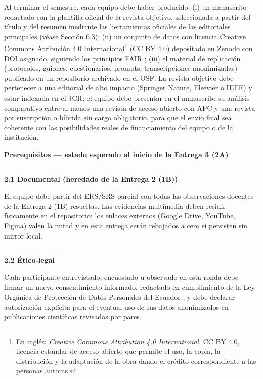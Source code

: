 \documentclass[11pt,a4paper]{article}
\newcounter{secc}
\newcommand{\secband}[1]{%
    \stepcounter{secc}\par\vspace{9pt}\noindent
    {\setlength{\fboxsep}{0pt}%
        \colorbox{uteqgold}{\parbox[c][20pt][c]{0.05\textwidth}{\centering\textbf{\color{white}\small \arabic{secc}}}}%
        \colorbox{uteqgreen}{\parbox[c][20pt][c]{0.95\textwidth}{\hspace{8pt}\textbf{\color{white}\small #1}}}%
    }\par\vspace{5pt}}
\newcommand{\submark}[1]{\par\vspace{4pt}\noindent
    {\color{uteqgreen}\rule[-1pt]{3.5pt}{12pt}}\hspace{6pt}\textbf{\color{uteqgreen}#1}\par\vspace{2pt}}
\begin{document}
\begin{pubbox}[title=Objetivo terminal (Entrega 4): publicación de alto impacto en revista con o sin APC]
Al terminar el semestre, cada equipo debe haber producido: (i) un manuscrito redactado con la plantilla oficial de la revista objetivo, seleccionada a partir del título y del resumen mediante las herramientas oficiales de las editoriales principales (véase Sección 6.3); (ii) un conjunto de datos con licencia Creative Commons Atribución 4.0 Internacional\footnote{En inglés: \emph{Creative Commons Attribution 4.0 International}, CC BY 4.0, licencia estándar de acceso abierto que permite el uso, la copia, la distribución y la adaptación de la obra dando el crédito correspondiente a las personas autoras.} (CC BY 4.0) depositado en Zenodo con DOI asignado, siguiendo los principios FAIR \cite{wilkinson2016fair}; (iii) el material de replicación (protocolos, guiones, cuestionarios, prompts, transcripciones anonimizadas) publicado en un repositorio archivado en el OSF.
La revista objetivo debe pertenecer a una editorial de alto impacto (Springer Nature, Elsevier o IEEE) y estar indexada en el JCR; el equipo debe presentar en el manuscrito su análisis comparativo entre al menos una revista de acceso abierto con APC y una revista por suscripción o híbrida sin cargo obligatorio, para que el envío final sea coherente con las posibilidades reales de financiamiento del equipo o de la institución.
\end{pubbox}

\secband{Prerequisitos --- estado esperado al inicio de la Entrega 3 (2A)}

\submark{2.1 Documental (heredado de la Entrega 2 (1B))}
El equipo debe partir del ERS/SRS parcial con todas las observaciones docentes de la Entrega 2 (1B) resueltas.
Las evidencias multimedia deben residir físicamente en el repositorio; los enlaces externos (Google Drive, YouTube, Figma) valen la mitad y en esta entrega serán rebajados a cero si persisten sin mirror local.

\submark{2.2 Ético-legal}
Cada participante entrevistado, encuestado u observado en esta ronda debe firmar un nuevo consentimiento informado, redactado en cumplimiento de la Ley Orgánica de Protección de Datos Personales del Ecuador \cite{ley_datos_ecuador_2021}, y debe declarar autorización explícita para el eventual uso de sus datos anonimizados en publicaciones científicas revisadas por pares.
\end{document}
